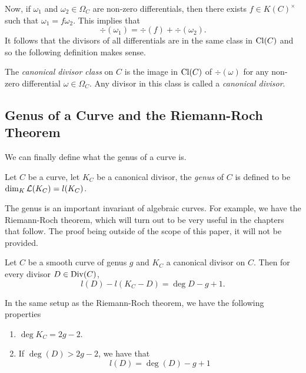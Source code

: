 Now, if $\omega_1$ and $\omega_2 \in \Omega_C$ are non-zero differentials, then
there exists $f\in K(C)^\times$ such that $\omega_1 = f\omega_2$.
This implies that
\begin{equation*}
	\div(\omega_1) = \div(f) + \div(\omega_2).
\end{equation*}
It follows that the divisors of all differentials are in the same class in
$\operatorname{Cl}(C)$ and so the following definition makes sense.

\begin{definition}
	The \emph{canonical divisor class} on $C$ is the image in $\operatorname{Cl}(C)$ of
	$\div(\omega)$ for any non-zero differential $\omega \in \Omega_C$.
	Any divisor in this class is called a \emph{canonical divisor}.
\end{definition}

\subsection{Genus of a Curve and the Riemann-Roch Theorem}

We can finally define what the genus of a curve is.
\begin{definition}
	Let $C$ be a curve, let $K_C$ be a canonical divisor,
	the \emph{genus} of $C$ is defined to be $\dim_K \mathcal{L}(K_C) = l(K_C)$.
\end{definition}

The genus is an important invariant of algebraic curves.
For example, we have the Riemann-Roch theorem, which will
turn out to be very useful in the chapters that follow.
The proof being outside of the scope of this paper, it will not be provided.
\begin{theorem}
	\label{thm:riemann-roch}
	Let $C$ be a smooth curve of genus $g$ and $K_C$ a canonical divisor on $C$.
	Then for every divisor $D \in \operatorname{Div}(C)$,
	\begin{equation*}
		l(D) - l(K_C - D) = \deg D - g + 1.
	\end{equation*}
\end{theorem}

\begin{corollary}
	\label{cor:riemann-roch}
	In the same setup as the Riemann-Roch theorem, we have the following properties
	\begin{enumerate}[itemsep=0em, label=(\alph*)]
		\item $\deg K_C = 2g - 2$.
		\item If $\deg(D) > 2g - 2$, we have that
			\begin{equation*}
				l(D) = \deg(D) - g + 1
			\end{equation*}	
	\end{enumerate}
\end{corollary}

